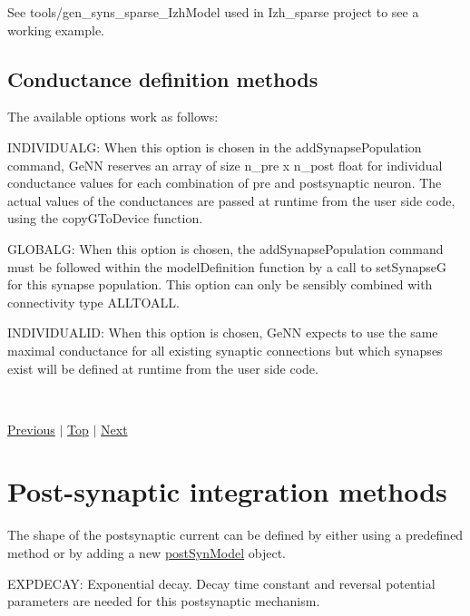 See tools/gen\+\_\+syns\+\_\+sparse\+\_\+\+Izh\+Model used in Izh\+\_\+sparse project to see a working example.\hypertarget{sect3_subsect33}{}\subsection{Conductance definition methods}\label{sect3_subsect33}
The available options work as follows\+:
\begin{DoxyItemize}
\item I\+N\+D\+I\+V\+I\+D\+U\+A\+L\+G\+: When this option is chosen in the {\ttfamily add\+Synapse\+Population} command, Ge\+N\+N reserves an array of size n\+\_\+pre x n\+\_\+post float for individual conductance values for each combination of pre and postsynaptic neuron. The actual values of the conductances are passed at runtime from the user side code, using the {\ttfamily copy\+G\+To\+Device} function.
\item G\+L\+O\+B\+A\+L\+G\+: When this option is chosen, the {\ttfamily add\+Synapse\+Population} command must be followed within the {\ttfamily model\+Definition} function by a call to {\ttfamily set\+Synapse\+G} for this synapse population. This option can only be sensibly combined with connectivity type A\+L\+L\+T\+O\+A\+L\+L.
\item I\+N\+D\+I\+V\+I\+D\+U\+A\+L\+I\+D\+: When this option is chosen, Ge\+N\+N expects to use the same maximal conductance for all existing synaptic connections but which synapses exist will be defined at runtime from the user side code.
\end{DoxyItemize}

~\newline
 

 \hyperlink{sect2}{Previous} $\vert$ \hyperlink{sect3}{Top} $\vert$ \hyperlink{sect_postsyn}{Next} \hypertarget{sect_postsyn}{}\section{Post-\/synaptic integration methods}\label{sect_postsyn}
The shape of the postsynaptic current can be defined by either using a predefined method or by adding a new \hyperlink{structpostSynModel}{post\+Syn\+Model} object.


\begin{DoxyItemize}
\item E\+X\+P\+D\+E\+C\+A\+Y\+: Exponential decay. Decay time constant and reversal potential parameters are needed for this postsynaptic mechanism.
\end{DoxyItemize}

